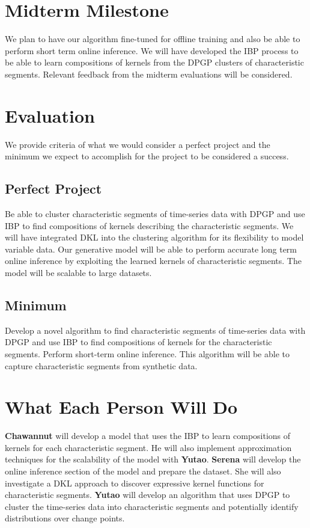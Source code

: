 \documentclass{article}
\begin{document}
\section{Midterm Milestone}
We plan to have our algorithm fine-tuned for offline training and also be able to perform short term online inference. We will have developed the IBP process to be able to learn compositions of kernels from the DPGP clusters of characteristic segments. Relevant feedback from the midterm evaluations will be considered.

\section{Evaluation}
We provide criteria of what we would consider a perfect project and the minimum we expect to accomplish for the project to be considered a success.
\subsection{Perfect Project}
Be able to cluster characteristic segments of time-series data with DPGP and use IBP to find compositions of kernels describing the characteristic segments. We will have integrated DKL into the clustering algorithm for its flexibility to model variable data. Our generative model will be able to perform accurate long term online inference by exploiting the learned kernels of characteristic segments. The model will be scalable to large datasets.
\subsection{Minimum}
Develop a novel algorithm to find characteristic segments of time-series data with DPGP and use IBP to find compositions of kernels for the characteristic segments. Perform short-term online inference. This algorithm will be able to capture characteristic segments from synthetic data.

\section{What Each Person Will Do}
\textbf{Chawannut} will develop a model that uses the IBP to learn compositions of kernels for each characteristic segment. He will also implement approximation techniques for the scalability of the model with \textbf{Yutao}. \textbf{Serena} will develop the online inference section of the model and prepare the dataset. She will also investigate a DKL approach to discover expressive kernel functions for characteristic segments. \textbf{Yutao} will develop an algorithm that uses DPGP to cluster the time-series data into characteristic segments and potentially identify distributions over change points. 
\end{document}
